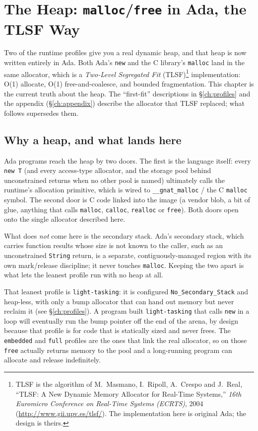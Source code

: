 \chapter{The Heap: \texttt{malloc}/\texttt{free} in Ada, the TLSF Way}
\label{ch:heap}

Two of the runtime profiles give you a real dynamic heap, and that heap is now
written entirely in Ada. Both Ada's \texttt{new} and the C library's
\texttt{malloc} land in the same allocator, which is a \emph{Two-Level
Segregated Fit} (TLSF)\footnote{TLSF is the algorithm of M.~Masmano, I.~Ripoll,
A.~Crespo and J.~Real, ``TLSF: A New Dynamic Memory Allocator for Real-Time
Systems,'' \emph{16th Euromicro Conference on Real-Time Systems (ECRTS)}, 2004
(\url{http://www.gii.upv.es/tlsf/}). The implementation here is original Ada; the
design is theirs.} implementation: O(1) allocate, O(1) free-and-coalesce,
and bounded fragmentation. This chapter is the current truth about the heap. The
``first-fit'' descriptions in \S\ref{ch:profiles} and the appendix
(\S\ref{ch:appendix}) describe the allocator that TLSF replaced; what follows
supersedes them.

\section{Why a heap, and what lands here}

Ada programs reach the heap by two doors. The first is the language itself: every
\texttt{new T} (and every access-type allocator, and the storage pool behind
unconstrained returns when no other pool is named) ultimately calls the runtime's
allocation primitive, which is wired to \texttt{\_\_gnat\_malloc} / the C
\texttt{malloc} symbol. The second door is C code linked into the image (a
vendor blob, a bit of glue, anything that calls \texttt{malloc}, \texttt{calloc},
\texttt{realloc} or \texttt{free}). Both doors open onto the single allocator
described here.

What does \emph{not} come here is the secondary stack. Ada's secondary stack,
which carries function results whose size is not known to the caller, such as an
unconstrained \texttt{String} return, is a separate, contiguously-managed
region with its own mark/release discipline; it never touches \texttt{malloc}.
Keeping the two apart is what lets the leanest profile run with no heap at all.

That leanest profile is \texttt{light-tasking}: it is configured
\texttt{No\_Secondary\_Stack} and heap-less, with only a bump allocator that can
hand out memory but never reclaim it (see \S\ref{ch:profiles}). A program built
\texttt{light-tasking} that calls \texttt{new} in a loop will eventually run the
bump pointer off the end of the arena, by design because that profile is for
code that is statically sized and never frees. The \texttt{embedded} and
\texttt{full} profiles are the ones that link the real allocator, so on those
\texttt{free} actually returns memory to the pool and a long-running program can
allocate and release indefinitely.

